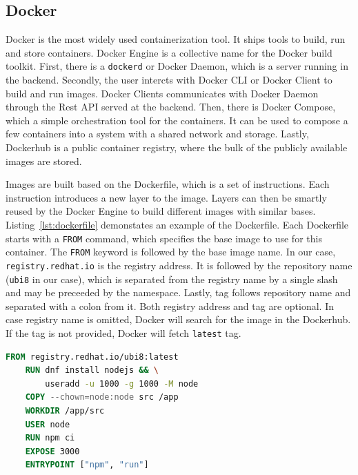 \subsection{Docker}

Docker is the most widely used containerization tool. It ships tools to build, run and store containers. Docker Engine is a collective name for the Docker build toolkit. First, there is a \lstinline{dockerd} or Docker Daemon, which is a server running in the backend. Secondly, the user intercts with Docker CLI or Docker Client to build and run images. Docker Clients communicates with Docker Daemon through the Rest API served at the backend. Then, there is Docker Compose, which a simple orchestration tool for the containers. It can be used to compose a few containers into a system with a shared network and storage. Lastly, Dockerhub is a public container registry, where the bulk of the publicly available images are stored.

Images are built based on the Dockerfile, which is a set of instructions. Each instruction introduces a new layer to the image. Layers can then be smartly reused by the Docker Engine to build different images with similar bases. Listing~\ref{lst:dockerfile} demonstates an example of the Dockerfile. Each Dockerfile starts with a \lstinline{FROM} command, which specifies the base image to use for this container. The \lstinline{FROM} keyword is followed by the base image name. In our case, \lstinline{registry.redhat.io} is the registry address. It is followed by the repository name (\lstinline{ubi8} in our case), which is separated from the registry name by a single slash and may be preceeded by the namespace. Lastly, tag follows repository name and separated with a colon from it. Both registry address and tag are optional. In case registry name is omitted, Docker will search for the image in the Dockerhub. If the tag is not provided, Docker will fetch \lstinline{latest} tag.

\begin{lstlisting}[language=Dockerfile, caption={A simple Dockerfile for a NodeJS app.}, label={lst:dockerfile}]
    FROM registry.redhat.io/ubi8:latest
    RUN dnf install nodejs && \
        useradd -u 1000 -g 1000 -M node
    COPY --chown=node:node src /app
    WORKDIR /app/src
    USER node
    RUN npm ci
    EXPOSE 3000
    ENTRYPOINT ["npm", "run"]
\end{lstlisting}

